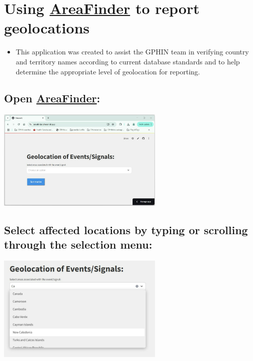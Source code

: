 \documentclass[a4paper,12pt]{article}
\begin{document}
\section{Using \href{https://areafinder.streamlit.app/}{AreaFinder} to report geolocations}

\begin{itemize}
    \item This application was created to assist the GPHIN team in verifying country and territory names according to current database standards and to help determine the appropriate level of geolocation for reporting.
\end{itemize}

\subsection{Open \href{https://areafinder.streamlit.app/}{AreaFinder}:}

\begin{center}
    \includegraphics[width=0.6\textwidth]{images/find_area_01.png}
\end{center}

\subsection{Select affected locations by typing or scrolling through the selection menu:}

\begin{center}
    \includegraphics[width=0.6\textwidth]{images/find_area_02.png}
\end{center}
\end{document}
